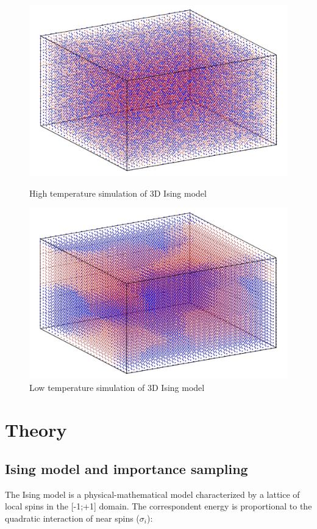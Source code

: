 \documentclass[11pt,a4paper]{article}
\begin{document}
\begin{figure}[h!]
  \centering
  \includegraphics[scale=0.25]{img/img1_intro.jpg}
  \caption[Source: "monteinsing code" https://inknos.github.io/monteising/]{High temperature simulation of 3D Ising model}
  \includegraphics[scale=0.25]{img/img2_intro.jpg}
  \caption[Source: "monteinsing code" https://inknos.github.io/monteising/]{Low temperature simulation of 3D Ising model}
\end{figure}


\newpage
\section{Theory}
\subsection{Ising model and importance sampling}
The Ising model is a physical-mathematical model characterized by a lattice of local spins in the [-1;+1] domain. The correspondent energy is proportional to the quadratic interaction of near spins ($\sigma_i$):
\end{document}

